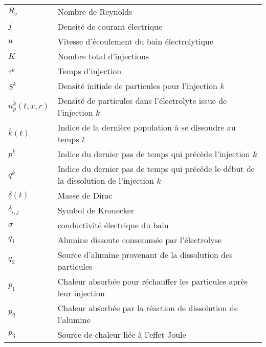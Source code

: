 \begin{tabularx}{\textwidth}{@{}lX@{}}
  $R_\mathrm{e}$ & Nombre de Reynolds \\
  $j$ & Densité de courant électrique \\
  $u$ & Vitesse d'écoulement du bain électrolytique \\
  $K$ & Nombre total d'injections \\
  $\tau^k$ & Temps d'injection \\
  $S^k$ & Densité initiale de particules pour l'injection $k$ \\
  $n_p^k(t, x, r)$ & Densité de particules dans l'électrolyte issue de l'injection $k$\\
  $\bar{k}(t)$ & Indice de la dernière population à se dissoudre au temps $t$ \\
  $p^k$ & Indice du dernier pas de temps qui précède l'injection $k$\\
  $q^k$ & Indice du dernier pas de temps qui précède le début de la dissolution de l'injection $k$\\
  $\delta(t)$ & Masse de Dirac \\
  $\delta_{i,j}$ & Symbol de Kronecker \\
  $\sigma$ & conductivité électrique du bain\\
  $q_1$ & Alumine dissoute consommée par l'électrolyse\\
  $q_2$ & Source d'alumine provenant de la dissolution des particules\\
  $p_1$ & Chaleur absorbée pour réchauffer les particules après leur injection\\
  $p_2$ & Chaleur absorbée par la réaction de dissolution de l'alumine\\
  $p_3$ & Source de chaleur liée à l'effet Joule\\
  \bottomrule
\end{tabularx}

